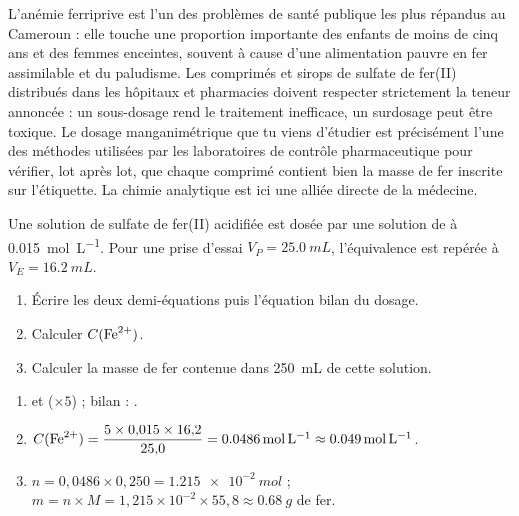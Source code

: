 \documentclass[11pt]{article}
\begin{document}
\begin{savaistu}
L'anémie ferriprive est l'un des problèmes de santé publique les plus répandus au Cameroun : elle touche une proportion importante des enfants de moins de cinq ans et des femmes enceintes, souvent à cause d'une alimentation pauvre en fer assimilable et du paludisme. Les comprimés et sirops de sulfate de fer(II) distribués dans les hôpitaux et pharmacies doivent respecter strictement la teneur annoncée : un sous-dosage rend le traitement inefficace, un surdosage peut être toxique. Le dosage manganimétrique que tu viens d'étudier est précisément l'une des méthodes utilisées par les laboratoires de contrôle pharmaceutique pour vérifier, lot après lot, que chaque comprimé contient bien la masse de fer inscrite sur l'étiquette. La chimie analytique est ici une alliée directe de la médecine.
\end{savaistu}

\begin{exercice}
Une solution de sulfate de fer(II) acidifiée est dosée par une solution de  à \SI{0,015}{mol.L^{-1}}. Pour une prise d'essai $V_P = \SI{25,0}{mL}$, l'équivalence est repérée à $V_E = \SI{16,2}{mL}$.
\begin{enumerate}
\item Écrire les deux demi-équations puis l'équation bilan du dosage.
\item Calculer $C(\ce{Fe^2+})$.
\item Calculer la masse de fer contenue dans \SI{250}{mL} de cette solution.
\end{enumerate}
\end{exercice}

\begin{corrige}[Exercice 1]
\begin{enumerate}
\item {} et  ($\times 5$) ; bilan : .
\item $C(\ce{Fe^2+}) = \dfrac{5 \times 0{,}015 \times 16{,}2}{25{,}0} = \SI{0,0486}{mol.L^{-1}} \approx \SI{0,049}{mol.L^{-1}}$.
\item $n = 0{,}0486 \times 0{,}250 = \SI{1,215e-2}{mol}$ ; $m = n \times M = 1{,}215 \times 10^{-2} \times 55{,}8 \approx \SI{0,68}{g}$ de fer.
\end{enumerate}
\end{corrige}
\end{document}

